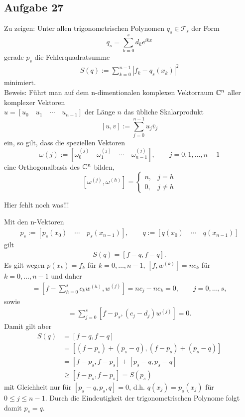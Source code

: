 \subsection*{Aufgabe 27}
Zu zeigen: Unter allen trigonometrischen Polynomen $q_s \in \mathcal{T}_s$ der Form
\[
	q_s= \sum_{k=0}^{s}d_ke^{ikx}
\]
gerade $p_s$ die Fehlerquadratsumme
\begin{align*}
	S(q):=\sum_{k=0}^{n-1}|f_k - q_s(x_k)|^2
\end{align*}
minimiert.\\ \newline
Beweis: Führt man auf dem n-dimentionalen komplexen Vektorraum $\mathbb C^n$ aller komplexer Vektoren\\
 $u=[u_0 \quad u_1 \quad \cdots \quad u_{n-1}]$ der Länge $n$ das übliche Skalarprodukt
\[
	[u,v] := \sum_{j=0}^{n-1}u_j\bar{v}_j
\]
ein, so gilt, dass die speziellen Vektoren
\[
	\omega {(j)}:=[\omega_0^{(j)} \quad \omega_1^{(j)} \quad \cdots \quad \omega_{n-1}^{(j)}], \qquad j=0,1,\dots,n-1
\]
eine Orthogonalbasis des $\mathbb C^n$ bilden,
\[
	[\omega^{(j)},\omega^{(h)}] = \left\{\begin{array}{ll} n, & j = h \\
	0, & j\neq h\end{array}\right.
\]

Hier fehlt noch was!!!\\ \newline

Mit den n-Vektoren
\begin{align*}
	p_s := [p_s(x_0)\quad \cdots \quad p_s(x_{n-1})], \qquad q:=[q(x_0) \quad \cdots \quad q(x_{n-1})]
\end{align*}
gilt
\begin{align*}
	S(q)=[f-q,f-q].
\end{align*}
Es gilt wegen $p(x_k)=f_k$ für $k=0, \dots ,n-1$, $[f,w^{(k)}]=nc_k$ für $k=0, \dots ,n-1$ und daher
\begin{align*}
	[f-p_s,w^{(k)}] = [f-\sum_{h=0}^{s}c_kw^{(h)}, w^{(j)}]=nc_j-nc_k=0,\qquad j=0, \dots ,s,
\end{align*}
sowie
\begin{align*}
	[f-p_s,p_s-q] = \sum_{j=0}^{s}[f-p_s,(c_j-d_j)w^{(j)}]=0.
\end{align*}
Damit gilt aber
\begin{align*}
	S(q) &= [f-q,f-q]\\
	&= [(f-p_s)+(p_s-q),(f-p_s)+(p_s-q)]\\
	&= [f-p_s,f-p_s]+[p_s-q,p_s-q]\\
	&\geq [f-p_s,f-p_s] = S(p_s)
\end{align*}
mit Gleichheit nur für $[p_s-q,p_s,q]=0$, d.h. $q(x_j)=p_s(x_j)$ für $0 \leq j \leq n-1$. Durch die Eindeutigkeit der trigonometrischen Polynome folgt damit $p_s=q$.